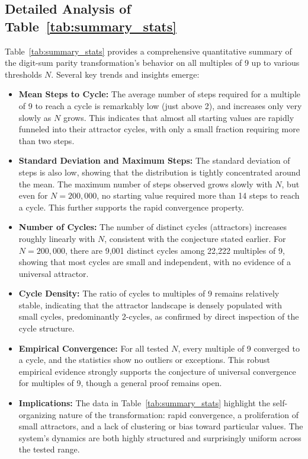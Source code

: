 \documentclass[12pt]{article}
\begin{document}
\subsection*{Detailed Analysis of Table~\ref{tab:summary_stats}}
Table~\ref{tab:summary_stats} provides a comprehensive quantitative summary of the digit-sum parity transformation's behavior on all multiples of 9 up to various thresholds $N$. Several key trends and insights emerge:
\begin{itemize}
    \item \textbf{Mean Steps to Cycle:} The average number of steps required for a multiple of 9 to reach a cycle is remarkably low (just above 2), and increases only very slowly as $N$ grows. This indicates that almost all starting values are rapidly funneled into their attractor cycles, with only a small fraction requiring more than two steps.
    \item \textbf{Standard Deviation and Maximum Steps:} The standard deviation of steps is also low, showing that the distribution is tightly concentrated around the mean. The maximum number of steps observed grows slowly with $N$, but even for $N=200,000$, no starting value required more than 14 steps to reach a cycle. This further supports the rapid convergence property.
    \item \textbf{Number of Cycles:} The number of distinct cycles (attractors) increases roughly linearly with $N$, consistent with the conjecture stated earlier. For $N=200,000$, there are 9,001 distinct cycles among 22,222 multiples of 9, showing that most cycles are small and independent, with no evidence of a universal attractor.
    \item \textbf{Cycle Density:} The ratio of cycles to multiples of 9 remains relatively stable, indicating that the attractor landscape is densely populated with small cycles, predominantly 2-cycles, as confirmed by direct inspection of the cycle structure.
    \item \textbf{Empirical Convergence:} For all tested $N$, every multiple of 9 converged to a cycle, and the statistics show no outliers or exceptions. This robust empirical evidence strongly supports the conjecture of universal convergence for multiples of 9, though a general proof remains open.
    \item \textbf{Implications:} The data in Table~\ref{tab:summary_stats} highlight the self-organizing nature of the transformation: rapid convergence, a proliferation of small attractors, and a lack of clustering or bias toward particular values. The system's dynamics are both highly structured and surprisingly uniform across the tested range.
\end{itemize}
\end{document}
